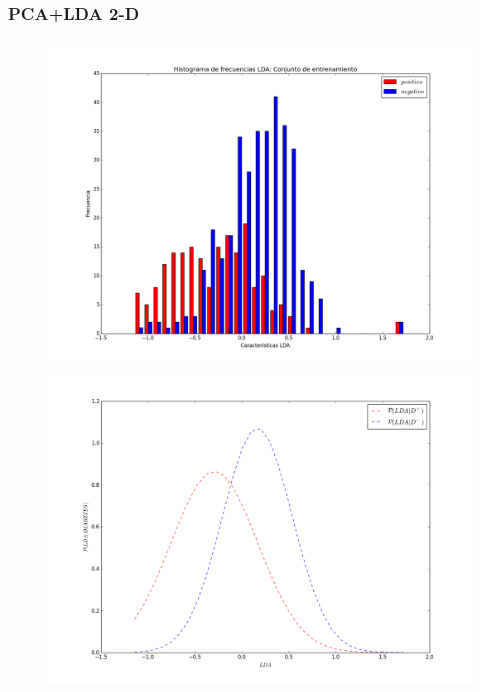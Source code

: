 \documentclass[letter, titlepage, 10pt]{article}
\begin{document}
\subsubsection{PCA+LDA 2-D}
  \begin{figure}[H]
  \centering
    \begin{minipage}{.5\textwidth}
        \centering
        \includegraphics[width=1\linewidth]{images/Histograma_D2}
    \end{minipage}%
    \begin{minipage}{.5\textwidth}
        \centering
        \includegraphics[width=1\linewidth]{images/PDF_D2}

\end{minipage}
\end{figure}
\end{document}
